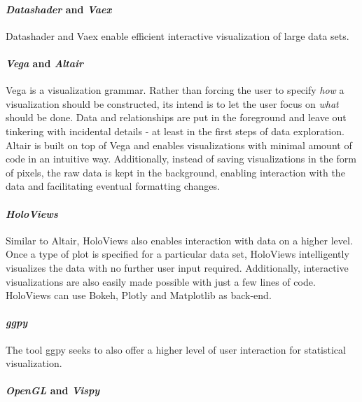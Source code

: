\documentclass[11pt]{article}
\begin{document}
\paragraph{\texorpdfstring{\emph{Datashader} and
\emph{Vaex}}{Datashader and Vaex}}\label{datashader-and-vaex}

Datashader and Vaex enable efficient interactive visualization of large
data sets.

\paragraph{\texorpdfstring{\emph{Vega} and
\emph{Altair}}{Vega and Altair}}\label{vega-and-altair}

Vega is a visualization grammar. Rather than forcing the user to specify
\emph{how} a visualization should be constructed, its intend is to let
the user focus on \emph{what} should be done. Data and relationships are
put in the foreground and leave out tinkering with incidental details -
at least in the first steps of data exploration. Altair is built on top
of Vega and enables visualizations with minimal amount of code in an
intuitive way. Additionally, instead of saving visualizations in the
form of pixels, the raw data is kept in the background, enabling
interaction with the data and facilitating eventual formatting changes.

\paragraph{\texorpdfstring{\emph{HoloViews}}{HoloViews}}\label{holoviews}

Similar to Altair, HoloViews also enables interaction with data on a
higher level. Once a type of plot is specified for a particular data
set, HoloViews intelligently visualizes the data with no further user
input required. Additionally, interactive visualizations are also easily
made possible with just a few lines of code. HoloViews can use Bokeh,
Plotly and Matplotlib as back-end.

\paragraph{\texorpdfstring{\emph{ggpy}}{ggpy}}\label{ggpy}

The tool ggpy seeks to also offer a higher level of user interaction for
statistical visualization.

\paragraph{\texorpdfstring{\emph{OpenGL} and
\emph{Vispy}}{OpenGL and Vispy}}\label{opengl-and-vispy}
\end{document}
